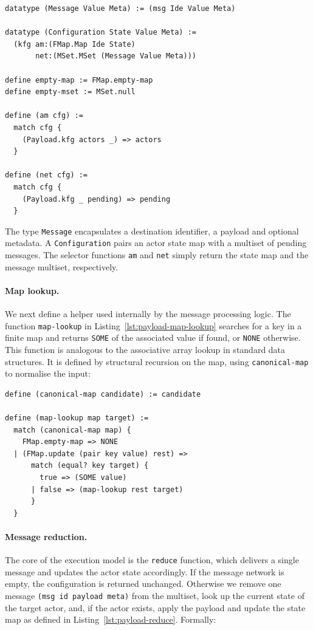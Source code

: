\begin{lstlisting}[language=Athena,style=athena]
datatype (Message Value Meta) := (msg Ide Value Meta)

datatype (Configuration State Value Meta) :=
  (kfg am:(FMap.Map Ide State)
       net:(MSet.MSet (Message Value Meta)))

define empty-map := FMap.empty-map
define empty-mset := MSet.null

define (am cfg) :=
  match cfg {
    (Payload.kfg actors _) => actors
  }

define (net cfg) :=
  match cfg {
    (Payload.kfg _ pending) => pending
  }
\end{lstlisting}

The type \lstinline{Message} encapsulates a destination identifier, a payload and optional metadata. A \lstinline{Configuration} pairs an actor state map with a multiset of pending messages. The selector functions \lstinline{am} and \lstinline{net} simply return the state map and the message multiset, respectively. %

\paragraph{Map lookup.} We next define a helper used internally by the message processing logic. The function \lstinline{map-lookup} in Listing~\ref{lst:payload-map-lookup} searches for a key in a finite map and returns \lstinline{SOME} of the associated value if found, or \lstinline{NONE} otherwise. This function is analogous to the associative array lookup in standard data structures. It is defined by structural recursion on the map, using \lstinline{canonical-map} to normalise the input:

\begin{lstlisting}[language=Athena,style=athena]
define (canonical-map candidate) := candidate

define (map-lookup map target) :=
  match (canonical-map map) {
    FMap.empty-map => NONE
  | (FMap.update (pair key value) rest) =>
      match (equal? key target) {
        true => (SOME value)
      | false => (map-lookup rest target)
      }
  }
\end{lstlisting}

\paragraph{Message reduction.} The core of the execution model is the \lstinline{reduce} function, which delivers a single message and updates the actor state accordingly. If the message network is empty, the configuration is returned unchanged. Otherwise we remove one message \lstinline{(msg id payload meta)} from the multiset, look up the current state of the target actor, and, if the actor exists, apply the payload and update the state map as defined in Listing~\ref{lst:payload-reduce}. Formally:

